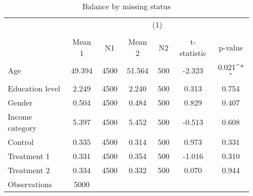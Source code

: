 \begin{table}[htbp]\centering
\def\sym#1{\ifmmode^{#1}\else\(^{#1}\)\fi}
\caption{Balance by missing status}
\begin{tabular}{l*{1}{cccccc}}
\hline\hline
                    &\multicolumn{6}{c}{(1)}                                                               \\
                    &\multicolumn{6}{c}{}                                                                  \\
                    &      Mean 1&          N1&      Mean 2&          N2& t-statistic&     p-value         \\
\hline
Age                 &      49.394&        4500&      51.564&         500&      -2.323&       0.021\sym{*}  \\
Education level     &       2.249&        4500&       2.240&         500&       0.313&       0.754         \\
Gender              &       0.504&        4500&       0.484&         500&       0.829&       0.407         \\
Income category     &       5.397&        4500&       5.452&         500&      -0.513&       0.608         \\
Control             &       0.335&        4500&       0.314&         500&       0.973&       0.331         \\
Treatment 1         &       0.331&        4500&       0.354&         500&      -1.016&       0.310         \\
Treatment 2         &       0.334&        4500&       0.332&         500&       0.070&       0.944         \\
\hline
Observations        &        5000&            &            &            &            &                     \\
\hline\hline
\end{tabular}
\end{table}
